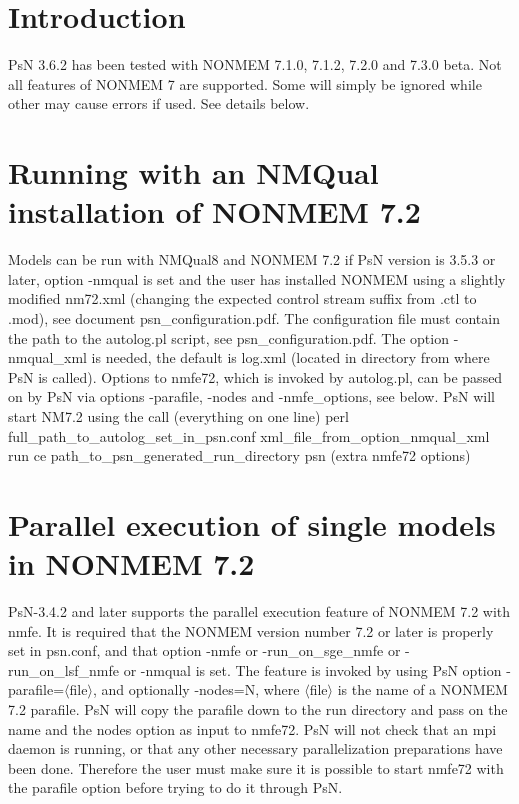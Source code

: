 



\maketitle


\section{Introduction}
PsN 3.6.2 has been tested with NONMEM 7.1.0, 7.1.2,  7.2.0 and 7.3.0 beta. Not all features of NONMEM 7 are supported. Some will simply be ignored while other may cause errors if used. See details below.

\section{Running with an NMQual installation of NONMEM 7.2}

Models can be run with NMQual8 and NONMEM 7.2 if PsN version is 3.5.3 or later, option -nmqual is set and the user has installed NONMEM using a slightly modified nm72.xml (changing the expected control stream suffix from .ctl to .mod), see document psn\_configuration.pdf. The configuration file must contain the path to the autolog.pl script, see psn\_configuration.pdf. The option -nmqual\_xml is needed, the default is log.xml (located in directory from where PsN is called). Options to nmfe72, which is invoked by autolog.pl, can be passed on by PsN via options -parafile, -nodes and -nmfe\_options, see below. PsN will start NM7.2 using the call (everything on one line)
perl    full\_path\_to\_autolog\_set\_in\_psn.conf    xml\_file\_from\_option\_nmqual\_xml    run    ce path\_to\_psn\_generated\_run\_directory    psn (extra nmfe72 options)


\section{Parallel execution of single models in NONMEM 7.2}

PsN-3.4.2 and later supports the parallel execution feature of NONMEM 7.2 with nmfe. It is required that the NONMEM version number 7.2 or later is properly set in psn.conf, and that option -nmfe or -run\_on\_sge\_nmfe or -run\_on\_lsf\_nmfe or -nmqual is set. The feature is invoked by using PsN option -parafile=$\langle$file$\rangle$, and optionally -nodes=N, where $\langle$file$\rangle$ is the name of a NONMEM 7.2 parafile. PsN will copy the parafile down to the run directory and pass on the name and the nodes option as input to nmfe72. PsN will not check that an mpi daemon is running, or that any other necessary parallelization preparations have been done. Therefore the user must make sure it is possible to start nmfe72 with the parafile option before trying to do it through PsN.

